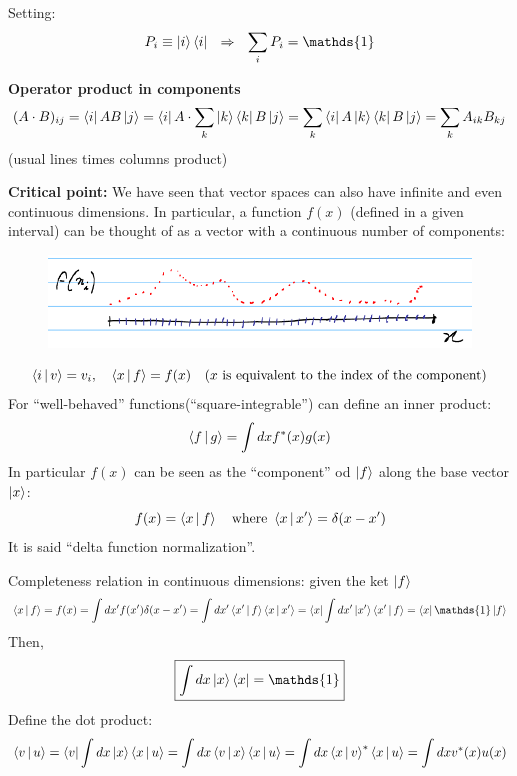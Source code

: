 \documentclass{article}
\begin{document}
\noindent
Setting:
\begin{equation}
    P_i \equiv \ket{i} \bra{i} \ \ \Rightarrow \ \ \sum_{i} P_i  = \mathds{1}
\end{equation}

\noindent
\textbf{Operator product in components}
\begin{equation}
    (A \cdot B)_{ij} = \bra{i} AB \ket{j} = \bra{i} A \cdot \sum_k \ket{k} \bra{k} B \ket{j} = \sum_{k} \bra{i} A \ket{k} \bra{k} B \ket{j} = \sum_k A_{ik} B_{kj}
\end{equation}
(usual lines times columns product)

\vspace{2mm}\noindent
\textbf{Critical point:} We have seen that vector spaces can also have infinite and even continuous dimensions. In particular, a function $f(x)$ (defined in a given interval) can be thought of as a vector with a continuous number of components:
\begin{figure}[h]
    \centering
    \includegraphics[width=0.6\linewidth]{fig4.png}
\end{figure}
\begin{equation}
    \Braket{i | v} = v_i, \quad \Braket{x|f} = f(x) \quad \text{($x$ is equivalent to the index of the component)}
\end{equation}
For ``well-behaved'' functions(``square-integrable'') can define an inner product:
\begin{equation}
    \Braket{f|g} = \int dx f^* (x) g(x)
\end{equation}
In particular $f(x)$ can be seen as the ``component'' od $\ket{f}$ along the base vector $\ket{x}$:
\begin{equation}
    f(x) = \Braket{x|f} \quad \text{where }\Braket{x|x'} = \delta(x-x')
\end{equation}
It is said ``delta function normalization''.

\noindent
Completeness relation in continuous dimensions: given the ket $\ket{f}$
\begin{equation}
    \Braket{x|f} = f(x) = \int dx' f(x') \delta{(x-x')} = \int dx' \Braket{x'|f}\Braket{x|x'} = \bra{x} \int dx' \ket{x'} \Braket{x' |f} = \bra{x} \mathds{1} \ket{f}
\end{equation}
Then,
\begin{equation}
    \boxed{\int dx \ket{x}\bra{x} = \mathds{1}}
\end{equation}
Define the dot product:
\begin{equation}
    \Braket{v|u} = \bra{v} \int dx \ket{x} \Braket{x|u} = \int dx \Braket{v|x} \Braket{x|u} = \int dx \Braket{x|v}^* \Braket{x|u} = \int dx v^* (x) u(x)
\end{equation}
\newpage
\end{document}
